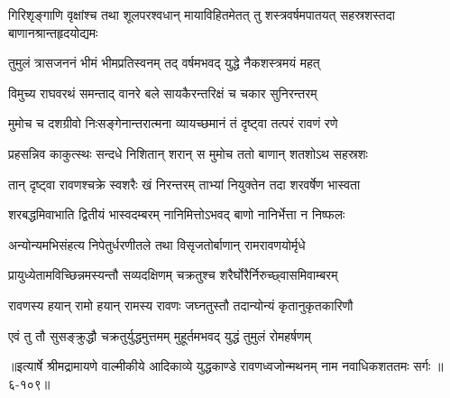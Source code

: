 \threelineshloka
{गिरिशृङ्गाणि वृक्षांश्च तथा शूलपरश्वधान्}
{मायाविहितमेतत् तु शस्त्रवर्षमपातयत्}
{सहस्रशस्तदा बाणानश्रान्तहृदयोद्यमः} %

\twolineshloka
{तुमुलं त्रासजननं भीमं भीमप्रतिस्वनम्}
{तद् वर्षमभवद् युद्धे नैकशस्त्रमयं महत्} %

\twolineshloka
{विमुच्य राघवरथं समन्ताद् वानरे बले}
{सायकैरन्तरिक्षं च चकार सुनिरन्तरम्} %

\twolineshloka
{मुमोच च दशग्रीवो निःसङ्गेनान्तरात्मना}
{व्यायच्छमानं तं दृष्ट्वा तत्परं रावणं रणे} %

\twolineshloka
{प्रहसन्निव काकुत्स्थः सन्दधे निशितान् शरान्}
{स मुमोच ततो बाणान् शतशोऽथ सहस्रशः} %

\twolineshloka
{तान् दृष्ट्वा रावणश्चक्रे स्वशरैः खं निरन्तरम्}
{ताभ्यां नियुक्तेन तदा शरवर्षेण भास्वता} %

\twolineshloka
{शरबद्धमिवाभाति द्वितीयं भास्वदम्बरम्}
{नानिमित्तोऽभवद् बाणो नानिर्भेत्ता न निष्फलः} %

\twolineshloka
{अन्योन्यमभिसंहत्य निपेतुर्धरणीतले}
{तथा विसृजतोर्बाणान् रामरावणयोर्मृधे} %

\twolineshloka
{प्रायुध्येतामविच्छिन्नमस्यन्तौ सव्यदक्षिणम्}
{चक्रतुश्च शरैर्घोरैर्निरुच्छ्वासमिवाम्बरम्} %

\twolineshloka
{रावणस्य हयान् रामो हयान् रामस्य रावणः}
{जघ्नतुस्तौ तदान्योन्यं कृतानुकृतकारिणौ} %

\twolineshloka
{एवं तु तौ सुसङ्क्रुद्धौ चक्रतुर्युद्धमुत्तमम्}
{मुहूर्तमभवद् युद्धं तुमुलं रोमहर्षणम्} %


॥इत्यार्षे श्रीमद्रामायणे वाल्मीकीये आदिकाव्ये युद्धकाण्डे रावणध्वजोन्मथनम् नाम नवाधिकशततमः सर्गः ॥६-१०९॥
